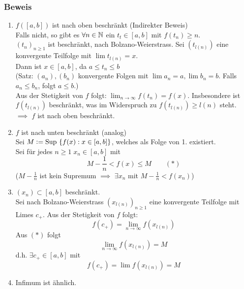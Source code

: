 \subsubsection*{Beweis}
\begin{enumerate}
\item $f([a,b])$ ist nach oben beschränkt (Indirekter Beweis) \\

Falls nicht, so gibt es $\forall n \in \mathbb{N}$ ein $t_{t}\in [a,b]$ mit $f(t_{n}) \geq n$. \\
$(t_{n})_{n\geq 1}$ ist beschränkt, nach Bolzano-Weierstrass. Sei $(t_{l(n)})$ eine konvergente Teilfolge mit $\lim{t_{l(n)}}=x$. \\
Dann ist $x\in [a,b]$, da $a\leq t_{n}\leq b$ \\
(Satz: $(a_{n}), (b_{n})$ konvergente Folgen mit $\lim{a_{n}} = a, \lim{b_{n}} = b$. Falls $a_{n} \leq b_{n}$, folgt $a \leq b$.) \\
Aus der Stetigkeit von $f$ folgt: $\lim_{n\to\infty}{f(t_{n})} = f(x)$. Insbesondere ist $f(t_{l(n)})$ beschränkt, was im Widerspruch zu $f(t_{l(n)})\geq l(n)$ steht. \\

$\implies$ $f$ ist nach oben beschränkt.

\item $f$ ist nach unten beschränkt (analog) \\

Sei $M \vcentcolon= \text{Sup }\{f(x):x\in [a,b]\}$, welches als Folge von 1. existiert. \\
Sei für jedes $n\geq 1\; x_{n}\in [a,b]$ mit \[M-\frac{1}{n} < f(x) \leq M \quad\quad (\ast)\]
($M-\frac{1}{n}$ ist kein Supremum $\implies$ $\exists x_{n}$ mit $M-\frac{1}{n} < f(x_{n})$)\\
\item $(x_{n}) \subset [a,b]$ beschränkt. \\
Sei nach Bolzano-Weierstrass $(x_{l(n)})_{n\geq 1}$ eine konvergente Teilfolge mit Limes $c_{+}$. Aus der Stetigkeit von $f$ folgt: \[ f(c_{+}) = \lim_{n\to\infty}{f(x_{l(n)})}\]
Aus $(\ast)$ folgt
\[ \lim_{n\to\infty}{f(x_{l(n)})} = M\]
d.h. $\exists c_{+} \in [a,b]$ mit \[ f(c_{+}) = \lim{f(x_{l(n)})} = M\]
\item Infimum ist ähnlich.
\end{enumerate}

